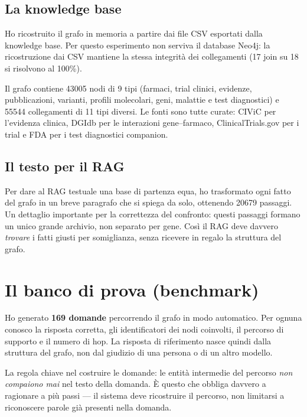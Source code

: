 \documentclass[11pt,a4paper]{report}
\begin{document}
\subsection{La knowledge base}

Ho ricostruito il grafo in memoria a partire dai file CSV esportati dalla
knowledge base. Per questo esperimento non serviva il database Neo4j: la
ricostruzione dai CSV mantiene la stessa integrità dei collegamenti
(17 join su 18 si risolvono al 100\%).

Il grafo contiene \num{43005} nodi di 9 tipi (farmaci, trial clinici,
evidenze, pubblicazioni, varianti, profili molecolari, geni, malattie e
test diagnostici) e \num{55544} collegamenti di 11 tipi diversi. Le fonti
sono tutte curate: CIViC per l'evidenza clinica, DGIdb per le interazioni
gene--farmaco, ClinicalTrials.gov per i trial e FDA per i test diagnostici
companion.

\subsection{Il testo per il RAG}

Per dare al RAG testuale una base di partenza equa, ho trasformato ogni
fatto del grafo in un breve paragrafo che si spiega da solo, ottenendo
\num{20679} passaggi. Un dettaglio importante per la correttezza del
confronto: questi passaggi formano un unico grande archivio, non separato
per gene. Così il RAG deve davvero \emph{trovare} i fatti giusti per
somiglianza, senza ricevere in regalo la struttura del grafo.

\section{Il banco di prova (benchmark)}

Ho generato \textbf{169 domande} percorrendo il grafo in modo automatico.
Per ognuna conosco la risposta corretta, gli identificatori dei nodi
coinvolti, il percorso di supporto e il numero di hop. La risposta di
riferimento nasce quindi dalla struttura del grafo, non dal giudizio di
una persona o di un altro modello.

La regola chiave nel costruire le domande: le entità intermedie del
percorso \emph{non compaiono mai} nel testo della domanda. È questo che
obbliga davvero a ragionare a più passi --- il sistema deve ricostruire il
percorso, non limitarsi a riconoscere parole già presenti nella domanda.
\end{document}
